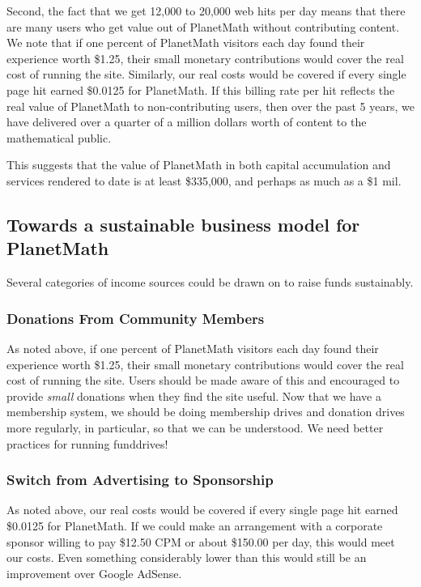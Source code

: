 Second, the fact that we get 12,000 to 20,000 web hits per day means that there
are many users who get value out of PlanetMath without contributing content. We
note that if one percent of PlanetMath visitors each day found their experience
worth \$1.25, their small monetary contributions would cover the real cost of
running the site. Similarly, our real costs would be covered if every single
page hit earned \$0.0125 for PlanetMath. If this billing rate per hit reflects
the real value of PlanetMath to non-contributing users, then over the past 5
years, we have delivered over a quarter of a million dollars worth of content
to the mathematical public.

This suggests that the value of PlanetMath in both capital
accumulation and services rendered to date is at least
\$335,000, and perhaps as much as a \$1 mil.

\subsection*{Towards a sustainable business model for PlanetMath}

Several categories of income sources could be drawn on to raise funds
sustainably. 

\subsubsection*{Donations From Community Members}
As noted above, if one percent of PlanetMath visitors each day found their
experience worth \$1.25, their small monetary contributions would cover the real
cost of running the site. Users should be made aware of this and encouraged to
provide \emph{small} donations when they find the site useful. Now that we have a
membership system, we should be doing membership drives and donation drives
more regularly, in particular, so that we can be understood. We need better
practices for running funddrives!

\subsubsection*{Switch from Advertising to Sponsorship}

As noted above, our real costs would be covered if every single page hit earned
\$0.0125 for PlanetMath. If we could make an arrangement with a corporate
sponsor willing to pay \$12.50 CPM or about \$150.00 per day, this would meet our
costs. Even something considerably lower than this would still be an
improvement over Google AdSense.

